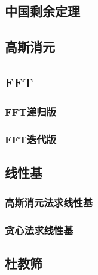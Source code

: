 \documentclass[10pt,a4paper]{article}
\begin{document}
\subsection{中国剩余定理}
\begin{spacing}{1.5}

\end{spacing}

\subsection{高斯消元}
\begin{spacing}{1.5}

\end{spacing}

\subsection{FFT}
\subsubsection{FFT递归版}

\subsubsection{FFT迭代版}

\subsection{线性基}
\subsubsection{高斯消元法求线性基}
\begin{spacing}{1.5}

\end{spacing}

\subsubsection{贪心法求线性基}
\begin{spacing}{1.5}

\end{spacing}

\subsection{杜教筛}
\begin{spacing}{1.5}

\end{spacing}

\end{document}
